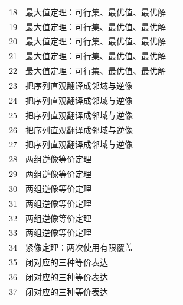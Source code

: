 \begin{longtable}{r p{.66\linewidth} r}
18 & 最大值定理：可行集、最优值、最优解 & \pageref{g:108:15}\\

19 & 最大值定理：可行集、最优值、最优解 & \pageref{g:108:15}\\

20 & 最大值定理：可行集、最优值、最优解 & \pageref{g:108:15}\\

21 & 最大值定理：可行集、最优值、最优解 & \pageref{g:108:15}\\

22 & 最大值定理：可行集、最优值、最优解 & \pageref{g:108:15}\\

23 & 把序列直观翻译成邻域与逆像 & \pageref{g:108:23}\\

24 & 把序列直观翻译成邻域与逆像 & \pageref{g:108:23}\\

25 & 把序列直观翻译成邻域与逆像 & \pageref{g:108:23}\\

26 & 把序列直观翻译成邻域与逆像 & \pageref{g:108:23}\\

27 & 把序列直观翻译成邻域与逆像 & \pageref{g:108:23}\\

28 & 两组逆像等价定理 & \pageref{g:108:28}\\

29 & 两组逆像等价定理 & \pageref{g:108:28}\\

30 & 两组逆像等价定理 & \pageref{g:108:28}\\

31 & 两组逆像等价定理 & \pageref{g:108:28}\\

32 & 两组逆像等价定理 & \pageref{g:108:28}\\

33 & 两组逆像等价定理 & \pageref{g:108:28}\\

34 & 紧像定理：两次使用有限覆盖 & \pageref{g:108:34}\\

35 & 闭对应的三种等价表达 & \pageref{g:108:35}\\

36 & 闭对应的三种等价表达 & \pageref{g:108:35}\\

37 & 闭对应的三种等价表达 & \pageref{g:108:35}\\


\end{longtable}
